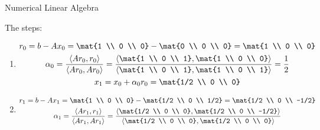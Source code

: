 \documentclass{article}
\begin{document}
    {Numerical Linear Algebra}

    \begin{tasks}
        \item The steps:
        \begin{enumerate}[label={(\arabic*)}]
            \item \begin{displaymath}
                \begin{gathered}
                    r_0 = b - Ax_0 = \mat{1 \\ 0 \\ 0} - \mat{0 \\ 0 \\ 0} = \mat{1 \\ 0 \\ 0} \\
                    \alpha_0 = \frac{\langle Ar_0, r_0\rangle}{\langle Ar_0, Ar_0 \rangle} 
                    = \frac{\left\langle \mat{1 \\ 0 \\ 1}, \mat{1 \\ 0 \\ 0}\right\rangle}{\left\langle \mat{1 \\ 0 \\ 1}, \mat{1 \\ 0 \\ 1}\right\rangle} 
                    = \frac{1}{2} \\
                    x_1 = x_0 + \alpha_0r_0 = \mat{1/2 \\ 0 \\ 0}
                \end{gathered}
            \end{displaymath}
            \item \begin{displaymath}
                \begin{gathered}
                    r_1 = b - Ax_1 = \mat{1 \\ 0 \\ 0} - \mat{1/2 \\ 0 \\ 1/2} = \mat{1/2 \\ 0 \\ -1/2} \\
                    \alpha_1 = \frac{\langle Ar_1, r_1\rangle}{\langle Ar_1, Ar_1 \rangle} 
                    = \frac{\left\langle \mat{1/2 \\ 0 \\ 0}, \mat{1/2 \\ 0 \\ -1/2}\right\rangle}{\left\langle \mat{1/2 \\ 0 \\ 0}, \mat{1/2 \\ 0 \\ 0}\right\rangle} 

\end{gathered}
\end{displaymath}
\end{enumerate}
\end{tasks}
\end{document}
